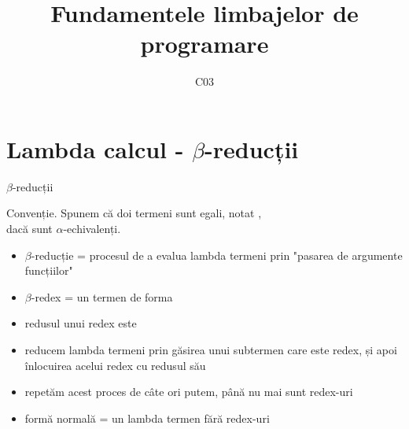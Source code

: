 \documentclass[xcolor=pdftex,romanian,colorlinks]{beamer}
\title[FLP]{Fundamentele limbajelor de programare}
\subtitle{C03}
\date{}
\begin{document}
\begin{frame}
  \titlepage
\end{frame}

\setlength{\leftmargini}{12pt}

\section{\color{section-color} Lambda calcul - $\beta$-reducții}

\begin{frame}[fragile]{$\beta$-reducții}

\alert{Convenție.} Spunem că doi termeni sunt egali, notat ,\\ dacă sunt $\alpha$-echivalenți.

\begin{itemize}
	\item \alert{$\beta$-reducție} = procesul de a evalua lambda termeni prin "pasarea de argumente funcțiilor"

	\item \alert{$\beta$-redex} = un termen de forma 

	\item \alert{redusul} unui redex  este 
	
	\item reducem lambda termeni prin găsirea unui subtermen care este redex, și apoi înlocuirea acelui redex cu redusul său
	
	\item repetăm acest proces de câte ori putem, până nu mai sunt redex-uri
	
	\item \alert{formă normală} = un lambda termen fără redex-uri
\end{itemize}
\end{frame}
\end{document}
